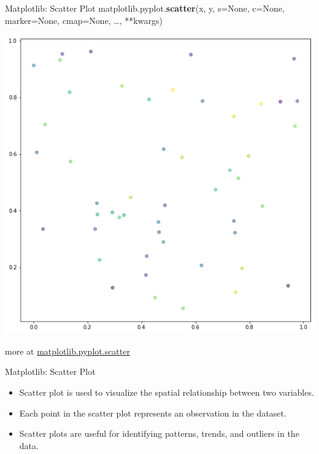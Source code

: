 \documentclass{beamer}
\begin{document}
    \begin{frame}[fragile]{Matplotlib: Scatter Plot}
        matplotlib.pyplot.\textbf{scatter}(x, y, s=None, c=None, marker=None, cmap=None, \dots, **kwargs)\\
        \begin{center}
            \includegraphics[width=\textwidth,height=0.6\textheight,keepaspectratio]{figures/Scatter.png}\\
        \end{center}
        more at \href{https://matplotlib.org/stable/api/_as_gen/matplotlib.pyplot.scatter.html}{matplotlib.pyplot.scatter}
    \end{frame}
    \begin{frame}[fragile]{Matplotlib: Scatter Plot}
        \begin{itemize}
            \item Scatter plot is used to visualize the spatial relationship between two variables.
            \item Each point in the scatter plot represents an observation in the dataset.
            \item Scatter plots are useful for identifying patterns, trends, and outliers in the data.
        \end{itemize}
    \end{frame}
\end{document}
